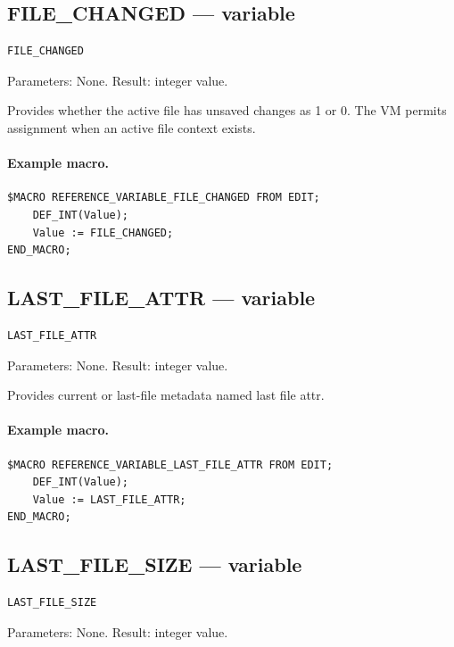 \documentclass[a4paper,10pt,twoside,openany]{book}
\begin{document}
\label{prim:variable-file-changed}
\subsection*{FILE\_CHANGED --- variable}
\begin{verbatim}
FILE_CHANGED
\end{verbatim}
Parameters: None. Result: integer value.

Provides whether the active file has unsaved changes as 1 or 0. The VM permits assignment when an active file context exists.

\paragraph{Example macro.}
\begin{verbatim}
$MACRO REFERENCE_VARIABLE_FILE_CHANGED FROM EDIT;
    DEF_INT(Value);
    Value := FILE_CHANGED;
END_MACRO;
\end{verbatim}

\label{prim:variable-last-file-attr}
\subsection*{LAST\_FILE\_ATTR --- variable}
\begin{verbatim}
LAST_FILE_ATTR
\end{verbatim}
Parameters: None. Result: integer value.

Provides current or last-file metadata named last file attr.

\paragraph{Example macro.}
\begin{verbatim}
$MACRO REFERENCE_VARIABLE_LAST_FILE_ATTR FROM EDIT;
    DEF_INT(Value);
    Value := LAST_FILE_ATTR;
END_MACRO;
\end{verbatim}

\label{prim:variable-last-file-size}
\subsection*{LAST\_FILE\_SIZE --- variable}
\begin{verbatim}
LAST_FILE_SIZE
\end{verbatim}
Parameters: None. Result: integer value.
\end{document}
